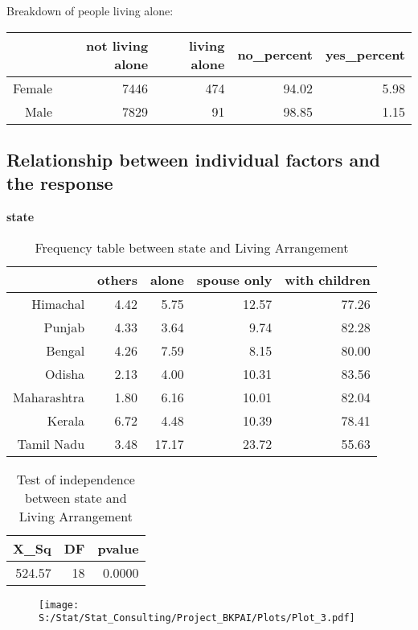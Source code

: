 \documentclass[11pt]{article}
\begin{document}
Breakdown of people living alone:
\begin{table}[H]
\centering
\begin{tabular}{rrrrr}
  \hline
 & not living alone & living alone & no\_percent & yes\_percent \\ 
  \hline
Female & 7446 & 474 & 94.02 & 5.98 \\ 
  Male & 7829 & 91 & 98.85 & 1.15 \\ 
   \hline
\end{tabular}
\end{table}\subsection*{Relationship between individual factors and the response}
{\bf{state}}%
\begin{table}[H]
\centering
\begin{tabular}{rrrrr}
  \hline
 & others & alone & spouse only & with children \\ 
  \hline
Himachal & 4.42 & 5.75 & 12.57 & 77.26 \\ 
  Punjab & 4.33 & 3.64 & 9.74 & 82.28 \\ 
  Bengal & 4.26 & 7.59 & 8.15 & 80.00 \\ 
  Odisha & 2.13 & 4.00 & 10.31 & 83.56 \\ 
  Maharashtra & 1.80 & 6.16 & 10.01 & 82.04 \\ 
  Kerala & 6.72 & 4.48 & 10.39 & 78.41 \\ 
  Tamil Nadu & 3.48 & 17.17 & 23.72 & 55.63 \\ 
   \hline
\end{tabular}
\caption{Frequency table between state and Living Arrangement} 
\end{table}
\begin{table}[H]
\centering
\begin{tabular}{rrr}
  \hline
X\_Sq & DF & pvalue \\ 
  \hline
524.57 & 18 & 0.0000 \\ 
   \hline
\end{tabular}
\caption{Test of independence between state and Living Arrangement} 
\end{table}
\begin{center}
\begin{figure}[H]
\texttt{[image: S:/Stat/Stat\_Consulting/Project\_BKPAI/Plots/Plot\_3.pdf]}

\end{figure}
\end{center}
\end{document}
